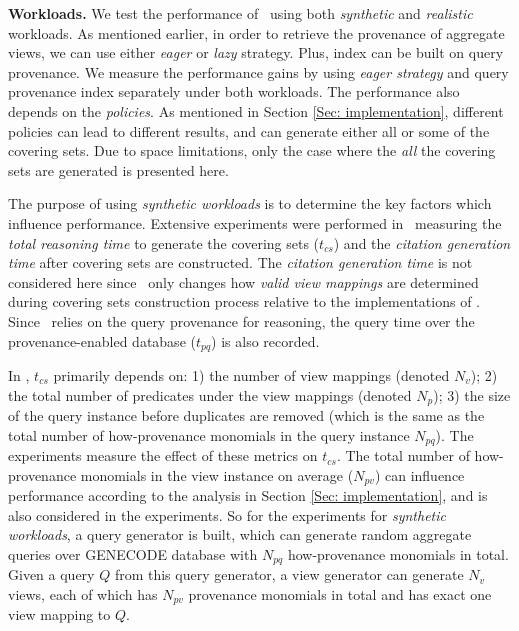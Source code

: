 {\bf Workloads.} 
We test the performance of \provalg\ using both {\em synthetic} and {\em realistic} workloads. As mentioned earlier, in order to retrieve the provenance of aggregate views, we can use either {\em eager} or {\em lazy} strategy. Plus, index can be built on query provenance. We measure the performance gains by using {\em eager strategy} and query provenance index separately under both workloads. The performance also depends on the {\em policies}. As mentioned in Section \ref{Sec: implementation}, different policies can lead to different results, and can generate either all or some of the covering sets. Due to space limitations, only the case where the {\em all} the covering sets are generated is presented here.

The purpose of using {\em synthetic workloads} is to determine the key factors which influence performance. 
Extensive experiments were performed in~\cite{wu2018data} measuring the \textit{total reasoning time}  to generate the covering sets ($t_{cs}$) and the \textit{citation generation time}   after covering sets are constructed.  The \textit{citation generation time} is not considered here since \provalg\ only changes how {\em valid view mappings} are determined during covering sets construction process %
relative to the implementations of \rba. Since \provalg\ relies on the query provenance for reasoning, the query time over the provenance-enabled database ($t_{pq}$) is also recorded.


In \cite{wu2018data}, $t_{cs}$ primarily depends on: 1) the number of view mappings (denoted $N_v$); 2) the total number of predicates under the view mappings (denoted $N_p$); 3) the size of the query instance before duplicates are removed (which is the same as the total number of how-provenance monomials in the query instance $N_{pq}$). The experiments measure the effect of these metrics on $t_{cs}$. %
The total number of how-provenance monomials in the view instance on average ($N_{pv}$) can influence performance according to the analysis in Section \ref{Sec: implementation}, and is also considered in the experiments. So for the experiments for {\em synthetic workloads}, a query generator is built, which can generate random aggregate queries over GENECODE database with $N_{pq}$ how-provenance monomials in total. Given a query $Q$ from this query generator, a view generator can generate $N_v$ views, each of which has $N_{pv}$ provenance monomials in total and has exact one view mapping to $Q$. 

